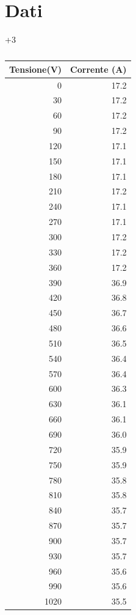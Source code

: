 \documentclass[10pt,twocolumn]{article}
\begin{document}
\section{Dati}
\begin{table}[H]+3
    \begin{minipage}{0.5\textwidth}
        \centering
        \caption*{}
        \label{tab:temp2}
        \begin{tabular}{|r|r|}
            \hline
            Tensione(V) & Corrente (A) \\ \hline
            0 & 17.2 \\ \hline
            30 & 17.2 \\ \hline
            60 & 17.2 \\ \hline
            90 & 17.2 \\ \hline
            120 & 17.1 \\ \hline
            150 & 17.1 \\ \hline
            180 & 17.1 \\ \hline
            210 & 17.2 \\ \hline
            240 & 17.1 \\ \hline
            270 & 17.1 \\ \hline
            300 & 17.2 \\ \hline
            330 & 17.2 \\ \hline
            360 & 17.2 \\ \hline
            390 & 36.9 \\ \hline
            420 & 36.8 \\ \hline
            450 & 36.7 \\ \hline
            480 & 36.6 \\ \hline
            510 & 36.5 \\ \hline
            540 & 36.4 \\ \hline
            570 & 36.4 \\ \hline
            600 & 36.3 \\ \hline
            630 & 36.1 \\ \hline
            660 & 36.1 \\ \hline
            690 & 36.0 \\ \hline
            720 & 35.9 \\ \hline
            750 & 35.9 \\ \hline
            780 & 35.8 \\ \hline
            810 & 35.8 \\ \hline
            840 & 35.7 \\ \hline
            870 & 35.7 \\ \hline
            900 & 35.7 \\ \hline
            930 & 35.7 \\ \hline
            960 & 35.6 \\ \hline
            990 & 35.6 \\ \hline
            1020 & 35.5 \\ \hline
        \end{tabular}
    \end{minipage}
\end{table}
\end{document}
